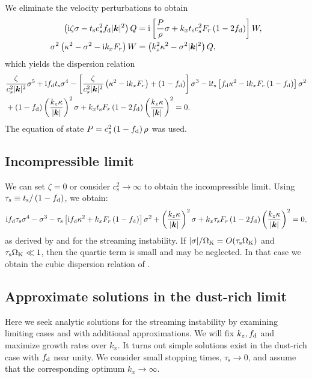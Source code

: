 We eliminate the velocity perturbations to obtain
\begin{align}
  \left(\mathrm{i} \zeta \sigma - t_\mathrm{s} c_s^2 f_\mathrm{d} |\bm{k}|^2\right)Q &=
  \mathrm{i} \left[
  \frac{P}{\rho}\sigma + k_xt_\mathrm{s} c_s^2 F_r\left(1 -
  2f_\mathrm{d}\right)\right]W, \label{si_QW1}\\
   \sigma^2 \left( \kappa^2 - \sigma^2 - \mathrm{i} k_x F_r\right)W &=
    \left(k_z^2\kappa^2 - \sigma^2|\bm{k}|^2\right)Q, 
\end{align}
which yields the dispersion relation
\begin{align}
  &\frac{\zeta}{c_s^2|\bm{k}|^2}\sigma^5 + \mathrm{i} f_\mathrm{d} t_\mathrm{s}
  \sigma^4 - \left[ \frac{\zeta}{c_s^2|\bm{k}|^2} \left(\kappa^2 - \mathrm{i}
  k_x F_r\right) + \left(1 - f_\mathrm{d}\right)\right]\sigma^3 - \mathrm{i}
  t_\mathrm{s} \left[f_\mathrm{d} \kappa^2 - \mathrm{i} k_x F_r\left( 1 -
  f_\mathrm{d}\right)\right]\sigma^2 \notag\\ 
  &+ \left(1 -
  f_\mathrm{d}\right)\left(\frac{k_z\kappa}{|\bm{k}|}\right)^2\sigma +
  k_x t_\mathrm{s} F_r\left(1 - 2f_\mathrm{d}\right)
  \left(\frac{k_z\kappa}{|\bm{k}|}\right)^2  = 0.\label{streaming_dispersion}
\end{align}
The equation of state $P = c_s^2\left( 1 - f_\mathrm{d}\right)\rho$
was used.


\subsection{Incompressible limit}

 We can set $\zeta = 0$ or consider $c_s^2\to \infty$ to
obtain the incompressible limit. Using $\tau_\mathrm{s} \equiv
t_\mathrm{s}/\left(1 - f_\mathrm{d}\right)$, we obtain: 
\begin{align}
\mathrm{i} f_\mathrm{d} \tau_\mathrm{s}
  \sigma^4 - \sigma^3 - 
  \tau_\mathrm{s} \left[ \mathrm{i} f_\mathrm{d} \kappa^2 + k_x F_r\left( 1 -
  f_\mathrm{d}\right)\right]\sigma^2 
  + \left(\frac{k_z\kappa}{|\bm{k}|}\right)^2\sigma + 
  k_x \tau_\mathrm{s} F_r\left(1 - 2f_\mathrm{d}\right)
  \left(\frac{k_z\kappa}{|\bm{k}|}\right)^2  = 0,\label{streaming_incompressible}
\end{align}
as derived by \cite{jacquet11} and \cite{laibe14} for the streaming
instability. 
If $|\sigma|/\Omega_{\rm K} = O(\tau_\mathrm{s}\Omega_{\rm K})$ and
$\tau_\mathrm{s}\Omega_{\rm K}\ll 1$, then the quartic term
is small and may be neglected. In that case we obtain the cubic
dispersion relation of \citet{youdin05a}. 



\subsection{Approximate solutions in the dust-rich limit}\label{si_dust_rich}
Here we seek analytic solutions for the streaming instability by 
examining limiting cases and with additional approximations. We will
fix $k_z, f_\mathrm{d}$ and maximize growth rates over $k_x$. It turns out
simple solutions exist in the dust-rich case with 
$f_\mathrm{d}$ near unity. We consider small stopping times, 
$\tau_\mathrm{s}\to0$, and assume that the corresponding optimum
$k_x\to\infty$.        


